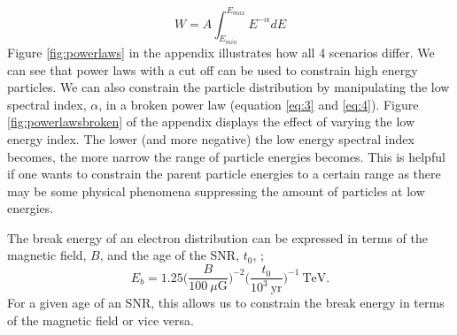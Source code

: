 \documentclass[12pt,a4paper]{article}
\begin{document}
\begin{equation} \label{eq:injenergy}
W = A \int_{E_{min}}^{E_{max}} E^{-\alpha} dE
\end{equation}
Figure \ref{fig:powerlaws} in the appendix illustrates how all 4 scenarios differ. We can see that power laws with a cut off can be used to constrain high energy particles. We can also constrain the particle distribution by manipulating the low spectral index, $\alpha$, in a broken power law (equation \ref{eq:3} and \ref{eq:4}). Figure \ref{fig:powerlawsbroken} of the appendix displays the effect of varying the low energy index. The lower (and more negative) the low energy spectral index becomes, the more narrow the range of particle energies becomes. This is helpful if one wants to constrain the parent particle energies to a certain range as there may be some physical phenomena suppressing the amount of particles at low energies. 

The break energy of an electron distribution can be expressed in terms of the magnetic field, $B$, and the age of the SNR, $t_0$, \citep{2008ApJ...685..988T};
\begin{equation} \label{eq:energybreak}
E_b = 1.25 \Bigg(\dfrac{B}{100 \ \mu \mathrm{G}}\Bigg)^{-2} \Bigg(\dfrac{t_0}{10^3 \ \mathrm{yr}}\Bigg)^{-1} \ \mathrm{TeV}.
\end{equation}
For a given age of an SNR, this allows us to constrain the break energy in terms of the magnetic field or vice versa.
\end{document}
